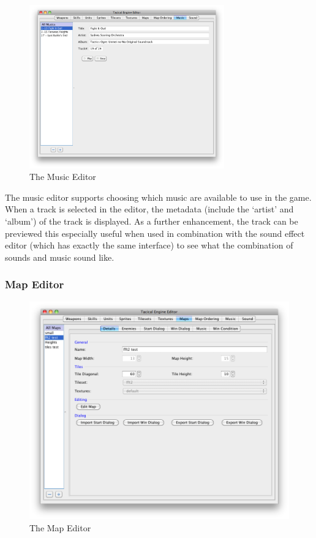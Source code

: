 \begin{figure}[htb]
	\centering
		\includegraphics[width=0.75\textwidth]{figures/editor/Music.png}
	\caption{The Music Editor}
	\label{fig:figures_editor_Music}
\end{figure}
The music editor supports choosing which music are available to use in the game.  When a track is selected in the editor, the metadata (include the `artist' and `album') of the track is displayed.  As a further enhancement, the track can be previewed this especially useful when used in combination with the  sound effect editor (which has exactly the same interface) to see what the combination of sounds and music sound like. 

\clearpage

\subsubsection{Map Editor}

\begin{figure}[htbp]
	\centering
		\includegraphics[width=.9\textwidth]{figures/editor/maps.png}
	\caption{The Map Editor}
	\label{fig:figures_editor_maps}
\end{figure}

